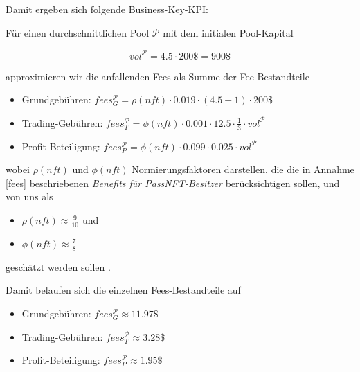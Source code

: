 \vspace{0.5cm}

Damit ergeben sich folgende Business-Key-KPI:

\vspace{0.3cm}

\begin{Fazit}

Für einen durchschnittlichen Pool $\mathcal{P}$ mit dem initialen Pool-Kapital

\begin{equation*}
  vol^{\mathcal{P}} = 4.5 \cdot 200\$ = 900\$ 
\end{equation*}

approximieren wir die anfallenden Fees als Summe der Fee-Bestandteile

\begin{itemize}
	\item Grundgebühren: $fees_{G}^{\mathcal{P}} = \rho(nft) \cdot 0.019 \cdot (4.5 - 1) \cdot 200\$ $
	\item Trading-Gebühren: $fees_{T}^{\mathcal{P}} = \phi(nft) \cdot 0.001 \cdot 12.5 \cdot \frac{1}{3} \cdot vol^{\mathcal{P}} $
	\item Profit-Beteiligung: $fees_{P}^{\mathcal{P}} = \phi(nft) \cdot 0.099 \cdot 0.025 \cdot vol^{\mathcal{P}} $
\end{itemize}

wobei $\rho(nft)$ und $\phi(nft)$ Normierungsfaktoren darstellen, die die in Annahme \ref{fees} beschriebenen \textit{Benefits für PassNFT-Besitzer} berücksichtigen sollen, und von uns als 

\begin{itemize}
	\item $\rho(nft) \approx \frac{9}{10}$ und 
	\item $\phi(nft) \approx \frac{7}{8}$
\end{itemize}	

geschätzt werden sollen .

\vspace{0.2cm}

Damit belaufen sich die einzelnen Fees-Bestandteile auf 

\begin{itemize}
	\item Grundgebühren: $fees_{G}^{\mathcal{P}} \approx 11.97\$ $
	\item Trading-Gebühren: $fees_{T}^{\mathcal{P}} \approx 3.28 \$ $
	\item Profit-Beteiligung: $fees_{P}^{\mathcal{P}} \approx 1.95 \$ $
\end{itemize}


\end{Fazit}
